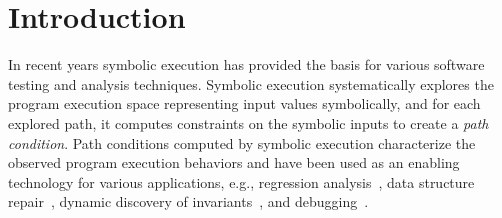 \section{Introduction}


In recent years symbolic execution has provided the basis for various
software testing and analysis techniques. Symbolic execution
systematically explores the program execution space representing input values symbolically, 
and for each explored path, it computes constraints on the
symbolic inputs to create a \emph{ path condition}.  Path
conditions computed by symbolic execution characterize the observed
program execution behaviors and have been used as an enabling
technology for various applications, e.g., regression
analysis~\cite{backes:2012,Godefroid:SAS11,Person:FSE08,person:pldi2011,Ramos:2011,Yang:ISSTA12},
data structure repair~\cite{KhurshidETAL05RepairingStructurally},
dynamic discovery of
invariants~\cite{CsallnerETAL08DySy,Zhang:ISSTA14}, and
debugging~\cite{Ma:2011}.

%




